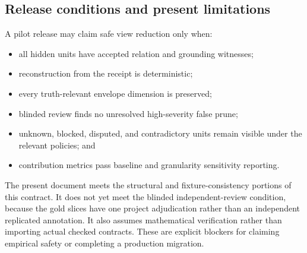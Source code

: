\subsection{Release conditions and present limitations}

A pilot release may claim safe view reduction only when:
\begin{itemize}
  \item all hidden units have accepted relation and grounding witnesses;
  \item reconstruction from the receipt is deterministic;
  \item every truth-relevant envelope dimension is preserved;
  \item blinded review finds no unresolved high-severity false prune;
  \item unknown, blocked, disputed, and contradictory units remain visible under the relevant policies; and
  \item contribution metrics pass baseline and granularity sensitivity reporting.
\end{itemize}

The present document meets the structural and fixture-consistency portions of this contract. It does not yet meet the blinded independent-review condition, because the gold slices have one project adjudication rather than an independent replicated annotation. It also assumes mathematical verification rather than importing actual checked contracts. These are explicit blockers for claiming empirical safety or completing a production migration.